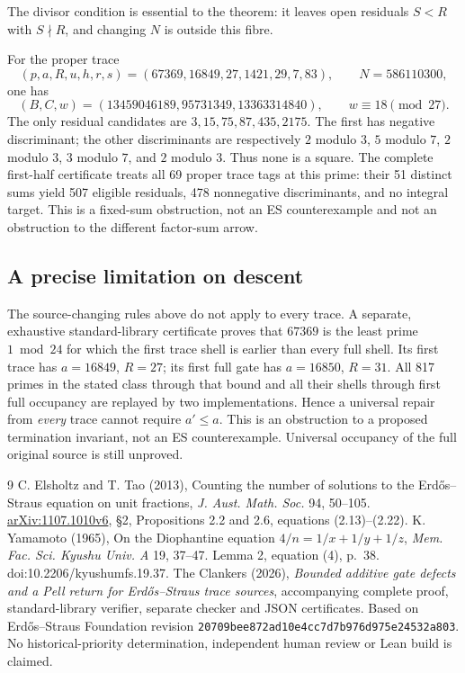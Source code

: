 \documentclass[10pt,reqno]{amsart}
\begin{document}
The divisor condition is essential to the theorem: it leaves open residuals
$S<R$ with $S\nmid R$, and changing $N$ is outside this fibre.

For the proper trace
\[
 (p,a,R,u,h,r,s)=(67369,16849,27,1421,29,7,83),\qquad
 N=586110300,
\]
one has
\[
 (B,C,w)=(13459046189,95731349,13363314840),\qquad
 w\equiv18\pmod{27}.
\]
The only residual candidates are $3,15,75,87,435,2175$.  The first has
negative discriminant; the other discriminants are respectively $2$ modulo
$3$, $5$ modulo $7$, $2$ modulo $3$, $3$ modulo $7$, and $2$ modulo $3$.
Thus none is a square.  The complete first-half certificate treats all 69
proper trace tags at this prime: their 51 distinct sums yield 507 eligible
residuals, 478 nonnegative discriminants, and no integral target.  This is a
fixed-sum obstruction, not an ES counterexample and not an obstruction to the
different factor-sum arrow.

\subsection*{A precise limitation on descent}
The source-changing rules above do not apply to every trace. A separate,
exhaustive standard-library certificate proves that $67369$ is the least
prime $1\bmod24$ for which the first trace shell is earlier than every full
shell. Its first trace has $a=16849$, $R=27$; its first full gate has $a=16850$,
$R=31$. All 817 primes in the stated class through that bound and all their
shells through first full occupancy are replayed by two implementations.
Hence a universal repair from \emph{every} trace cannot require $a'\le a$.
This is an obstruction to a proposed termination invariant, not an ES
counterexample. Universal occupancy of the full original source is still
unproved.

\begin{thebibliography}{9}
 C. Elsholtz and T. Tao (2013), Counting the number of solutions to
the Erd\H{o}s--Straus equation on unit fractions, \emph{J. Aust. Math. Soc.}
94, 50--105. \href{https://arxiv.org/abs/1107.1010}{arXiv:1107.1010v6},
\S2, Propositions 2.2 and 2.6, equations (2.13)--(2.22).
 K. Yamamoto (1965), On the Diophantine equation
$4/n=1/x+1/y+1/z$, \emph{Mem. Fac. Sci. Kyushu Univ. A} 19, 37--47.
Lemma 2, equation (4), p.~38. doi:10.2206/kyushumfs.19.37.
 The Clankers (2026), \emph{Bounded additive gate defects and a
Pell return for Erd\H{o}s--Straus trace sources}, accompanying complete proof,
standard-library verifier, separate checker and JSON certificates.
Based on Erd\H{o}s--Straus Foundation revision
\texttt{20709bee872ad10e4cc7d7b976d975e24532a803}.
No historical-priority determination, independent human review or Lean build
is claimed.
\end{thebibliography}
\end{document}
